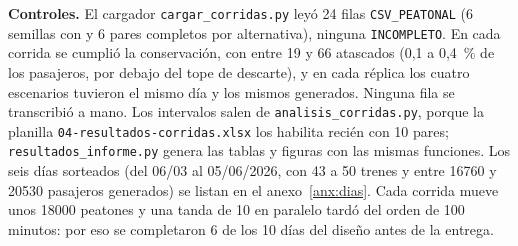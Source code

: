 \textbf{Controles.} El cargador \texttt{cargar\_corridas.py} leyó 24 filas \texttt{CSV\_PEATONAL} (6 semillas con
\EO{} y 6 pares completos por alternativa), ninguna \texttt{INCOMPLETO}. En cada corrida se cumplió la
conservación, con entre 19 y 66 atascados (0,1 a 0,4~\% de los pasajeros, por debajo del tope de descarte), y en
cada réplica los cuatro escenarios tuvieron el mismo día y los mismos generados. Ninguna fila se transcribió a
mano. Los intervalos salen de \texttt{analisis\_corridas.py}, porque la planilla
\texttt{04-resultados-corridas.xlsx} los habilita recién con 10 pares; \texttt{resultados\_informe.py} genera
las tablas y figuras con las mismas funciones. Los seis días sorteados (del 06/03 al 05/06/2026, con 43 a 50
trenes y entre \num{16760} y \num{20530} pasajeros generados) se listan en el anexo~\ref{anx:dias}. Cada corrida
mueve unos \num{18000} peatones y una tanda de 10 en paralelo tardó del orden de 100 minutos: por eso se
completaron 6 de los 10 días del diseño antes de la entrega.
